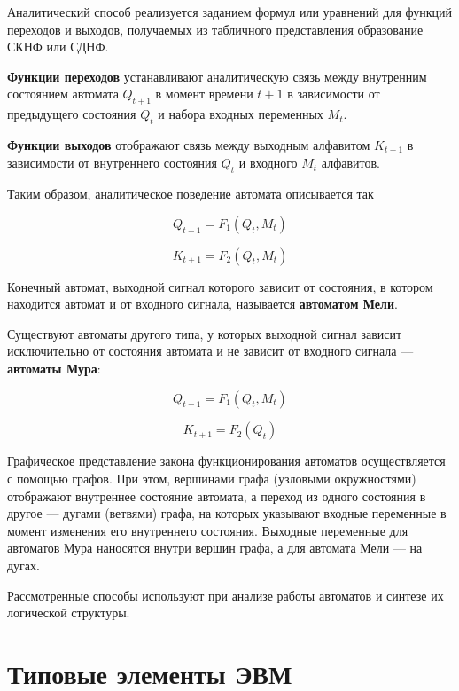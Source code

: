 \documentclass[10pt,a4paper,titlepage]{article}
\begin{document}

Аналитический способ реализуется заданием формул или уравнений для функций переходов и выходов, получаемых из табличного представления образование СКНФ или СДНФ.

\textbf{Функции переходов} устанавливают аналитическую связь между внутренним состоянием автомата $Q_{t+1}$ в момент времени $t+1$ в зависимости от предыдущего состояния $Q_t$ и набора входных переменных $M_t$.

\textbf{Функции выходов} отображают связь между выходным алфавитом $K_{t+1}$ в зависимости от внутреннего состояния $Q_t$ и входного $M_t$ алфавитов.

Таким образом, аналитическое поведение автомата описывается так

\[Q_{t+1}=F_1(Q_t,M_t)\]

\[K_{t+1}=F_2(Q_t,M_t)\]

Конечный автомат, выходной сигнал которого зависит от состояния, в котором находится автомат и от входного сигнала, называется \textbf{автоматом Мели}.

Существуют автоматы другого типа, у которых выходной сигнал зависит исключительно от состояния автомата и не зависит от входного сигнала --- \textbf{автоматы Мура}:

\[Q_{t+1}=F_1(Q_t,M_t)\]

\[K_{t+1}=F_2(Q_t)\]

Графическое представление закона функционирования автоматов осуществляется с помощью графов.
При этом, вершинами графа (узловыми окружностями) отображают внутреннее состояние автомата, а переход из одного состояния в другое --- дугами (ветвями) графа, на которых указывают входные переменные в момент изменения его внутреннего состояния.
Выходные переменные для автоматов Мура наносятся внутри вершин графа, а для автомата Мели --- на дугах.

Рассмотренные способы используют при анализе работы автоматов и синтезе их логической структуры.

\newpage
\section{Типовые элементы ЭВМ}
\end{document}
